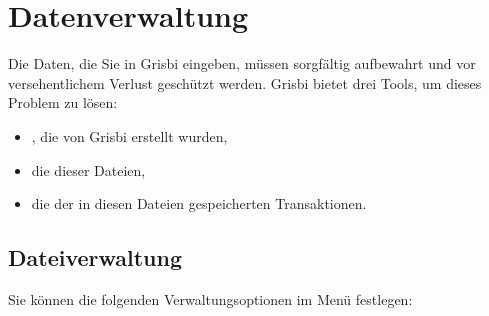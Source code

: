 
\chapter{Datenverwaltung\label{datamanagement}}%


Die Daten, die Sie in Grisbi eingeben, müssen sorgfältig aufbewahrt und vor versehentlichem Verlust geschützt werden. Grisbi bietet drei Tools, um dieses Problem zu lösen:
\begin{itemize}
	\item {}, die von Grisbi erstellt wurden,
	\item die  dieser Dateien,
	\item die  der in diesen Dateien gespeicherten Transaktionen.
\end{itemize}

\section{Dateiverwaltung\label{datamanagement-files}}%

Sie können die folgenden Verwaltungsoptionen im Menü  festlegen:

